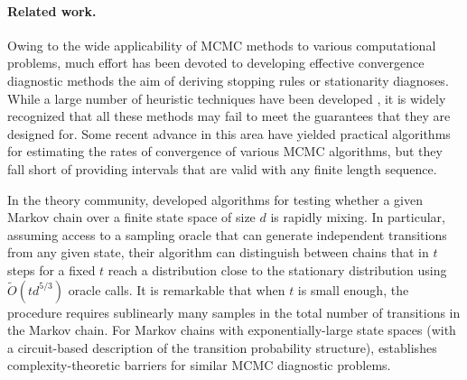 \paragraph{Related work.} 
Owing to the wide applicability of MCMC methods to various computational
problems, much effort has been devoted to developing effective convergence
diagnostic methods the aim of deriving stopping rules or stationarity
diagnoses. While a large number of heuristic techniques have been developed
\citep[e.g.,][]{MCMCDiscussion93,CoCa96}, it is widely recognized that all
these methods may fail to meet the guarantees that they are designed for.
Some recent advance in this area \citep{1209.0703,Gyori-paulin15} have
yielded practical algorithms for estimating the rates of convergence
of various MCMC algorithms, but they fall short of providing intervals
that are valid with any finite length sequence.

In the theory community, \citet{BaFoRuSmiWhi00,BaFoRuSmiWhi13}
developed algorithms for testing whether a given Markov chain over a
finite state space of size $d$ is rapidly mixing.
In particular, assuming access to a sampling oracle that can generate
independent transitions from any given state, their algorithm can
distinguish between chains that in $t$ steps for a fixed $t$ reach a
distribution close to the stationary distribution using $\tilde{O}(t
d^{5/3})$ oracle calls.
It is remarkable that when $t$ is small enough, the procedure requires
sublinearly many samples in the total number of transitions in the
Markov chain.
For Markov chains with exponentially-large state spaces (with a
circuit-based description of the transition probability structure),
\citet{BhaBoMo11} establishes complexity-theoretic barriers for
similar MCMC diagnostic problems.

